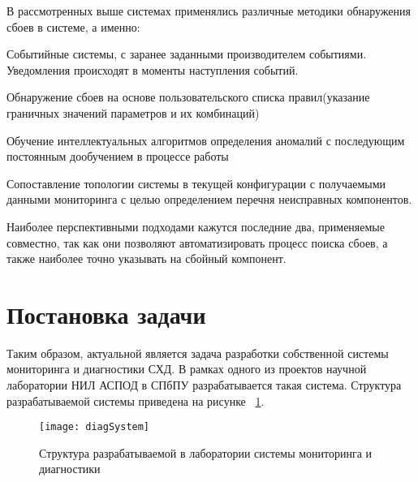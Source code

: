 В рассмотренных выше системах применялись различные методики обнаружения сбоев в системе, а именно:
\begin{itemize*}
	\item{Событийные системы, с заранее заданными производителем событиями. Уведомления происходят в моменты наступления событий.}
	\item{Обнаружение сбоев на основе пользовательского списка правил(указание граничных значений параметров и их комбинаций)}
	\item{Обучение интеллектуальных алгоритмов определения аномалий с последующим постоянным дообучением в процессе работы}
	\item{Сопоставление топологии системы в текущей конфигурации с получаемыми данными мониторинга с целью определением перечня неисправных компонентов.}
\end{itemize*}
Наиболее перспективными подходами кажутся последние два, применяемые совместно, так как они позволяют автоматизировать процесс поиска сбоев, а также наиболее точно указывать на сбойный компонент. 

\section{Постановка задачи}

Таким образом, актуальной является задача разработки собственной системы мониторинга и диагностики СХД. В рамках одного из проектов научной лаборатории НИЛ АСПОД в СПбПУ разрабатывается такая система. Структура разрабатываемой системы приведена на рисунке ~\ref{fig:diagSystem}.
\begin{figure}[!h]
	\centering
	\texttt{[image: diagSystem]}
	\caption{Структура разрабатываемой в лаборатории системы мониторинга и диагностики}
	\label{fig:diagSystem}
\end{figure}

